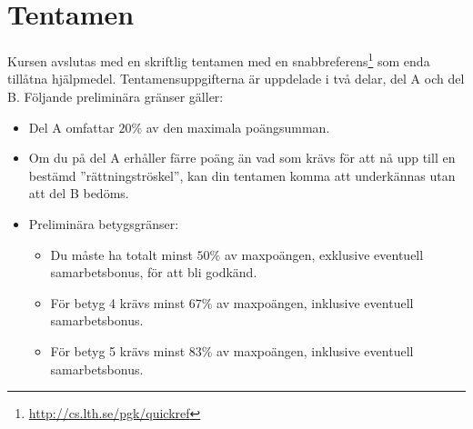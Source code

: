 \section{Tentamen}

Kursen avslutas med en skriftlig tentamen med en snabbreferens\footnote{\url{http://cs.lth.se/pgk/quickref}} som enda tillåtna hjälpmedel. Tentamensuppgifterna är uppdelade i två delar, del A och del B. Följande preliminära gränser gäller:

\begin{itemize}

\item Del A omfattar $20\%$ av den maximala poängsumman.
\item  Om du på del A erhåller färre poäng än vad som krävs för att nå upp till en bestämd ''rättningströskel'', kan din tentamen komma att underkännas utan att del B bedöms.
\item Preliminära betygsgränser:
\begin{itemize}
\item Du måste ha totalt minst $50\%$ av maxpoängen, exklusive eventuell samarbetsbonus, för att bli godkänd.
\item  För betyg 4 krävs minst $67\%$ av maxpoängen, inklusive eventuell samarbetsbonus.
\item  För betyg 5 krävs minst $83\%$ av maxpoängen, inklusive eventuell samarbetsbonus.
\end{itemize}
\end{itemize}
